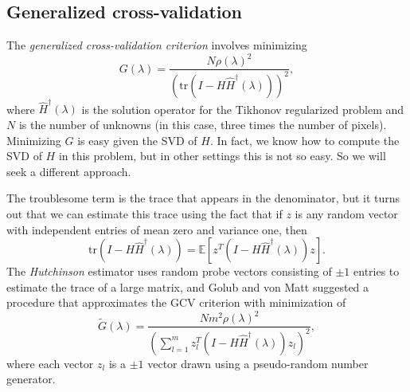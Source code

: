 \documentclass[12pt, leqno]{article} %
\begin{document}
\subsection{Generalized cross-validation}

The {\em generalized cross-validation criterion} involves minimizing
\[
  G(\lambda) =
  \frac{N \rho(\lambda)^2}
       {\left( \mathrm{tr}(I-H \hat{H}^{\dagger}(\lambda)) \right)^2},
\]
where $\hat{H}^\dagger(\lambda)$ is the solution operator for
the Tikhonov regularized problem and $N$ is the number of unknowns
(in this case, three times the number of pixels).  Minimizing $G$ is
easy given the SVD of $H$.  In fact, we know how to compute the SVD
of $H$ in this problem, but in other settings this is not so easy.
So we will seek a different approach.

The troublesome
term is the trace that appears in the denominator, but it turns out
that we can estimate this trace using the fact that if $z$ is any
random vector with independent entries of mean zero and variance one,
then
\[
  \mathrm{tr}(I-H \hat{H}^\dagger(\lambda)) =
  \mathbb{E}\left[ z^T (I-H \hat{H}^\dagger(\lambda)) z \right].
\]
The {\em Hutchinson} estimator uses random probe vectors consisting
of $\pm 1$ entries to estimate the trace of a large matrix, and Golub
and von Matt suggested a procedure that approximates the GCV criterion
with minimization of
\[
  \tilde{G}(\lambda) =
  \frac{Nm^2 \rho(\lambda)^2}
  {\left( \sum_{l=1}^m z_l^T(I-H \hat{H}^{\dagger}(\lambda)) z_l \right)^2},
\]
where each vector $z_l$ is a $\pm 1$ vector drawn using a pseudo-random
number generator.
\end{document}
